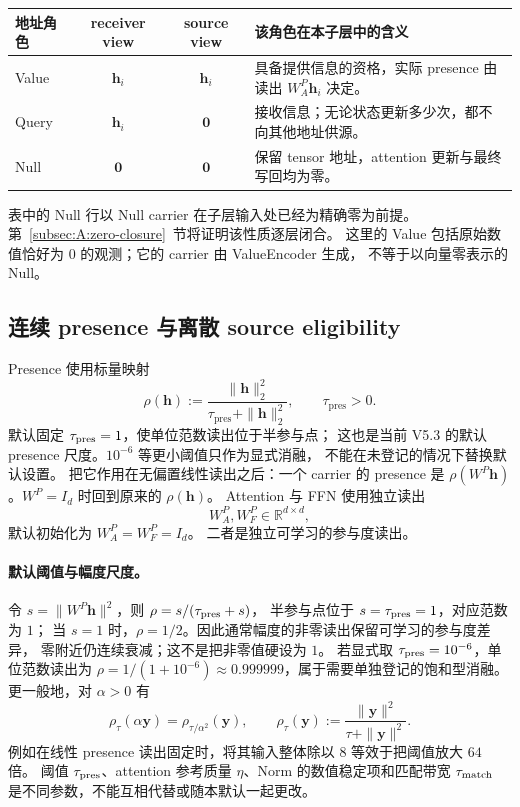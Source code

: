 \documentclass[11pt,UTF8,fontset=fandol]{ctexart}
\numberwithin{equation}{section}
\theoremstyle{definition}
\newcommand{\R}{\mathbb R}
\begin{document}
\begin{center}
\small
\begin{tabularx}{\textwidth}{lccX}
\toprule
地址角色 & receiver view & source view & 该角色在本子层中的含义\\
\midrule
Value & $\bm h_i$ & $\bm h_i$ & 具备提供信息的资格，实际 presence 由读出 $W_A^{P}\bm h_i$ 决定。\\
Query & $\bm h_i$ & $\bm0$ & 接收信息；无论状态更新多少次，都不向其他地址供源。\\
Null & $\bm0$ & $\bm0$ & 保留 tensor 地址，attention 更新与最终写回均为零。\\
\bottomrule
\end{tabularx}
\end{center}

表中的 Null 行以 Null carrier 在子层输入处已经为精确零为前提。
第~\ref{subsec:A:zero-closure}~节将证明该性质逐层闭合。
这里的 Value 包括原始数值恰好为 $0$ 的观测；它的 carrier 由 ValueEncoder 生成，
不等于以向量零表示的 Null。



\subsection{连续 presence 与离散 source eligibility}
\label{subsec:A:presence}

Presence 使用标量映射
\begin{equation}
  \rho(\bm h)
  :=\frac{\|\bm h\|_2^2}{\tau_{\mathrm{pres}}+\|\bm h\|_2^2},
  \qquad \tau_{\mathrm{pres}}>0.
  \label{eq:A:presence}
\end{equation}
默认固定 $\tau_{\rm pres}=1$，使单位范数读出位于半参与点；
这也是当前 V5.3 的默认 presence 尺度。$10^{-6}$ 等更小阈值只作为显式消融，
不能在未登记的情况下替换默认设置。
把它作用在无偏置线性读出之后：一个 carrier 的 presence 是
$\rho(W^{P}\bm h)$。$W^{P}=I_d$ 时回到原来的 $\rho(\bm h)$。
Attention 与 FFN 使用独立读出
\begin{equation}
  W_A^{P},W_F^{P}\in\R^{d\times d},
  \label{eq:A:presence-readouts}
\end{equation}
默认初始化为 $W_A^{P}=W_F^{P}=I_d$。
二者是独立可学习的参与度读出。

\paragraph{默认阈值与幅度尺度。}
令 $s=\|W^{P}\bm h\|^2$，则 $\rho=s/(\tau_{\rm pres}+s)$，
半参与点位于 $s=\tau_{\rm pres}=1$，对应范数为 $1$；
当 $s=1$ 时，$\rho=1/2$。因此通常幅度的非零读出保留可学习的参与度差异，
零附近仍连续衰减；这不是把非零值硬设为 $1$。
若显式取 $\tau_{\rm pres}=10^{-6}$，单位范数读出为
$\rho=1/(1+10^{-6})\approx0.999999$，属于需要单独登记的饱和型消融。
更一般地，对 $\alpha>0$ 有
\begin{equation}
 \rho_{\tau}(\alpha\bm y)=\rho_{\tau/\alpha^2}(\bm y),\qquad
 \rho_{\tau}(\bm y):=\frac{\|\bm y\|^2}{\tau+\|\bm y\|^2}.
 \label{v53:eq:presence-scale}
\end{equation}
例如在线性 presence 读出固定时，将其输入整体除以 $8$ 等效于把阈值放大 $64$ 倍。
阈值 $\tau_{\rm pres}$、attention 参考质量 $\eta$、Norm 的数值稳定项和匹配带宽
$\tau_{\rm match}$ 是不同参数，不能互相代替或随本默认一起更改。
\end{document}
